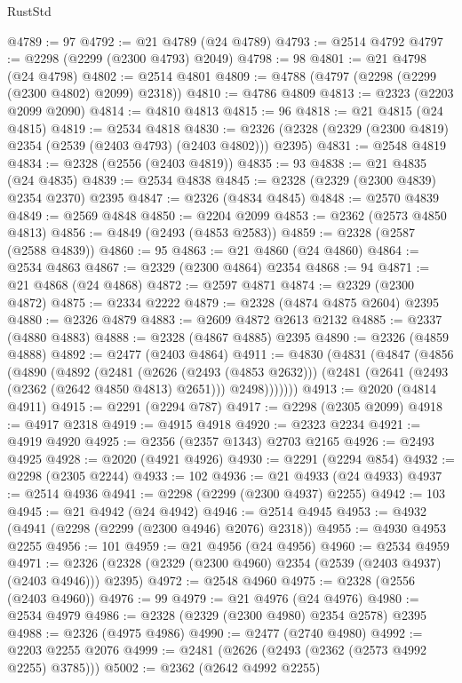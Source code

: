 \begin{lexlean}{RustStd}
\begin{coremodule}
{\begin{coremodule}
{{{{{{{{{{{{{{{{{{{{{{{{{{{{{{{{{{{{{@4789 := 97
@4792 := @21 @4789 (@24 @4789)
@4793 := @2514 @4792
@4797 := @2298 (@2299 (@2300 @4793) @2049)
@4798 := 98
@4801 := @21 @4798 (@24 @4798)
@4802 := @2514 @4801
@4809 := @4788 (@4797 (@2298 (@2299 (@2300 @4802) @2099) @2318))
@4810 := @4786 @4809
@4813 := @2323 (@2203 @2099 @2090)
@4814 := @4810 @4813
@4815 := 96
@4818 := @21 @4815 (@24 @4815)
@4819 := @2534 @4818
@4830 := @2326 (@2328 (@2329 (@2300 @4819) @2354 (@2539 (@2403 @4793) (@2403 @4802))) @2395)
@4831 := @2548 @4819
@4834 := @2328 (@2556 (@2403 @4819))
@4835 := 93
@4838 := @21 @4835 (@24 @4835)
@4839 := @2534 @4838
@4845 := @2328 (@2329 (@2300 @4839) @2354 @2370) @2395
@4847 := @2326 (@4834 @4845)
@4848 := @2570 @4839
@4849 := @2569 @4848
@4850 := @2204 @2099
@4853 := @2362 (@2573 @4850 @4813)
@4856 := @4849 (@2493 (@4853 @2583))
@4859 := @2328 (@2587 (@2588 @4839))
@4860 := 95
@4863 := @21 @4860 (@24 @4860)
@4864 := @2534 @4863
@4867 := @2329 (@2300 @4864) @2354
@4868 := 94
@4871 := @21 @4868 (@24 @4868)
@4872 := @2597 @4871
@4874 := @2329 (@2300 @4872)
@4875 := @2334 @2222
@4879 := @2328 (@4874 @4875 @2604) @2395
@4880 := @2326 @4879
@4883 := @2609 @4872 @2613 @2132
@4885 := @2337 (@4880 @4883)
@4888 := @2328 (@4867 @4885) @2395
@4890 := @2326 (@4859 @4888)
@4892 := @2477 (@2403 @4864)
@4911 := @4830
    (@4831
      (@4847
        (@4856
          (@4890
            (@4892
              (@2481
                (@2626 (@2493 (@4853 @2632)))
                (@2481 (@2641 (@2493 (@2362 (@2642 @4850 @4813) @2651))) @2498)))))))
@4913 := @2020 (@4814 @4911)
@4915 := @2291 (@2294 @787)
@4917 := @2298 (@2305 @2099)
@4918 := @4917 @2318
@4919 := @4915 @4918
@4920 := @2323 @2234
@4921 := @4919 @4920
@4925 := @2356 (@2357 @1343) @2703 @2165
@4926 := @2493 @4925
@4928 := @2020 (@4921 @4926)
@4930 := @2291 (@2294 @854)
@4932 := @2298 (@2305 @2244)
@4933 := 102
@4936 := @21 @4933 (@24 @4933)
@4937 := @2514 @4936
@4941 := @2298 (@2299 (@2300 @4937) @2255)
@4942 := 103
@4945 := @21 @4942 (@24 @4942)
@4946 := @2514 @4945
@4953 := @4932 (@4941 (@2298 (@2299 (@2300 @4946) @2076) @2318))
@4955 := @4930 @4953 @2255
@4956 := 101
@4959 := @21 @4956 (@24 @4956)
@4960 := @2534 @4959
@4971 := @2326 (@2328 (@2329 (@2300 @4960) @2354 (@2539 (@2403 @4937) (@2403 @4946))) @2395)
@4972 := @2548 @4960
@4975 := @2328 (@2556 (@2403 @4960))
@4976 := 99
@4979 := @21 @4976 (@24 @4976)
@4980 := @2534 @4979
@4986 := @2328 (@2329 (@2300 @4980) @2354 @2578) @2395
@4988 := @2326 (@4975 @4986)
@4990 := @2477 (@2740 @4980)
@4992 := @2203 @2255 @2076
@4999 := @2481 (@2626 (@2493 (@2362 (@2573 @4992 @2255) @3785)))
@5002 := @2362 (@2642 @4992 @2255)
}}}}}}}}}}}}}}}}}}}}}}}}}}}}}}}}}}}}}
\end{coremodule}}
\end{coremodule}
\end{lexlean}
